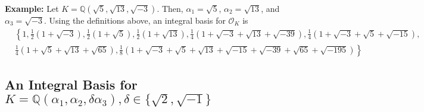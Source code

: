 \documentclass{amsart}
\begin{document}
\textbf{Example:} Let $K=\mathbb{Q}\left(\sqrt{5},\sqrt{13},\sqrt{-3}\right).$ Then, $\alpha_1 = \sqrt{5}$, $ \alpha_2 = \sqrt{13}$, and $\alpha_3 = \sqrt{-3}$. Using the definitions above, an integral basis for $\mathcal{O}_K$ is 
\begin{align*}
      & \left\{1,\frac{1}{2}(1+\sqrt{-3}), \frac{1}{2}(1+\sqrt{5}),\frac{1}{2}(1+\sqrt{13}),  \frac{1}{4}(1 + \sqrt{-3} + \sqrt{13} + \sqrt{-39}),\frac{1}{4}(1+ \sqrt{-3} + \sqrt{5} + \sqrt{-15}), \right. \\
      & \left.\frac{1}{4}(1 + \sqrt{5} + \sqrt{13} + \sqrt{65}), \frac{1}{8}(1+\sqrt{-3} + \sqrt{5} + \sqrt{13} + \sqrt{-15} + \sqrt{-39} + \sqrt{65} + \sqrt{-195}) \right\}
\end{align*}

\newpage
\subsection{An Integral Basis for $K=\mathbb{Q}\left(\alpha_1,\alpha_2,\delta \alpha_3\right), \delta \in \{\sqrt{2},\sqrt{-1}\}$}
\end{document}
